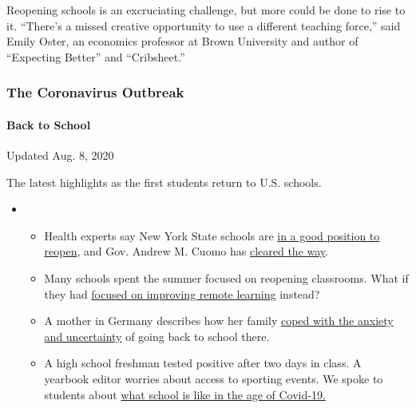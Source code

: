 Reopening schools is an excruciating challenge, but more could be done
to rise to it. ``There's a missed creative opportunity to use a
different teaching force,'' said Emily Oster, an economics professor at
Brown University and author of ``Expecting Better'' and ``Cribsheet.''

\hypertarget{the-coronavirus-outbreak}{%
\subsubsection{The Coronavirus
Outbreak}\label{the-coronavirus-outbreak}}

\hypertarget{back-to-school}{%
\paragraph{Back to School}\label{back-to-school}}

Updated Aug. 8, 2020

The latest highlights as the first students return to U.S. schools.

\begin{itemize}
\item
  \begin{itemize}
  \tightlist
  \item
    Health experts say New York State schools are
    \href{https://www.nytimes.com/2020/08/07/health/coronavirus-ny-schools-reopen.html?action=click\&pgtype=Article\&state=default\&region=MAIN_CONTENT_2\&context=storylines_keepup}{in
    a good position to reopen}, and Gov. Andrew M. Cuomo has
    \href{https://www.nytimes.com/2020/08/07/nyregion/cuomo-schools-reopening.html?action=click\&pgtype=Article\&state=default\&region=MAIN_CONTENT_2\&context=storylines_keepup}{cleared
    the way}.
  \item
    Many schools spent the summer focused on reopening classrooms. What
    if they had
    \href{https://www.nytimes.com/2020/08/07/us/remote-learning-fall-2020.html?action=click\&pgtype=Article\&state=default\&region=MAIN_CONTENT_2\&context=storylines_keepup}{focused
    on improving remote learning} instead?
  \item
    A mother in Germany describes how her family
    \href{https://www.nytimes.com/2020/08/07/parenting/germany-schools-reopening-children.html?action=click\&pgtype=Article\&state=default\&region=MAIN_CONTENT_2\&context=storylines_keepup}{coped
    with the anxiety and uncertainty} of going back to school there.
  \item
    A high school freshman tested positive after two days in class. A
    yearbook editor worries about access to sporting events. We spoke to
    students about
    \href{https://www.nytimes.com/2020/08/06/us/coronavirus-students.html?action=click\&pgtype=Article\&state=default\&region=MAIN_CONTENT_2\&context=storylines_keepup}{what
    school is like in the age of Covid-19.}
  \end{itemize}
\end{itemize}

